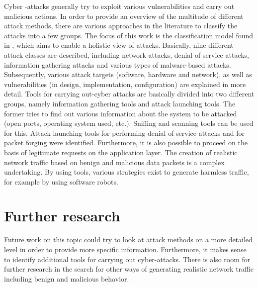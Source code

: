 \documentclass[conference]{IEEEtran}
\begin{document}
Cyber -attacks generally try to exploit various vulnerabilities and carry out malicious actions. In order to provide an overview of the multitude of different attack methods, there are various approaches in the literature to classify the attacks into a few groups. The focus of this work is the classification model found in  \cite{b5}, which aims to enable a holistic view of attacks. Basically, nine different attack classes are described, including network attacks, denial of service attacks, information gathering attacks and various types of malware-based attacks. Subsequently, various attack targets (software, hardware and network), as well as vulnerabilities (in design, implementation, configuration) are explained in more detail.
Tools for carrying out-cyber attacks are basically divided into two different groups, namely information gathering tools and attack launching tools. The former tries to find out various information about the system to be attacked (open ports, operating system used, etc.). Sniffing and scanning tools can be used for this. Attack launching tools for performing denial of service attacks and for packet forging were identified. Furthermore, it is also possible to proceed on the basis of legitimate requests on the application layer. The creation of realistic network traffic based on benign and malicious data packets is a complex undertaking. By using tools, various strategies exist to generate harmless traffic, for example by using software robots.

\section{Further research}
Future work on this topic could try to look at attack methods on a more detailed level in order to provide more specific information. Furthermore, it makes sense to identify additional tools for carrying out cyber-attacks. There is also room for further research in the search for other ways of generating realistic network traffic including benign and malicious behavior. 
\end{document}
